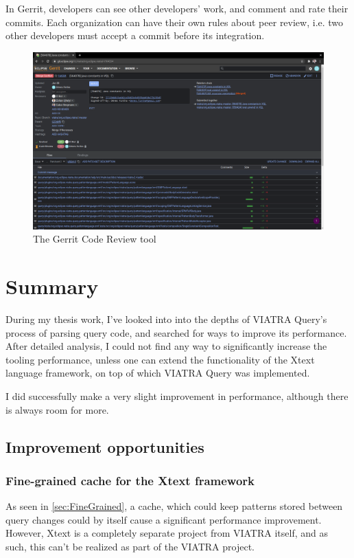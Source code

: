 \documentclass[11pt,a4paper,oneside]{report}
\begin{document}
In Gerrit, developers can see other developers' work, and comment and rate their
commits. Each organization can have their own rules about peer review, i.e. two
other developers must accept a commit before its integration.

\begin{figure}[ht]
\centering
\includegraphics[width=150mm, keepaspectratio]{figures/gerrit.png}
\caption{The Gerrit Code Review tool}
\label{fig:gerrit}
\end{figure}

\chapter{Summary}

During my thesis work, I've looked into into the depths of VIATRA Query's
process of parsing query code, and searched for ways to improve its performance.
After detailed analysis, I could not find any way to significantly increase the
tooling performance, unless one can extend the functionality of the Xtext
language framework, on top of which VIATRA Query was implemented.

I did successfully make a very slight improvement in performance, although there
is always room for more.

\section{Improvement opportunities}

\subsection{Fine-grained cache for the Xtext framework}
As seen in \ref{sec:FineGrained}, a cache, which could keep patterns stored
between query changes could by itself cause a significant performance
improvement. However, Xtext is a completely separate project from VIATRA itself,
and as such, this can't be realized as part of the VIATRA project.
\end{document}
